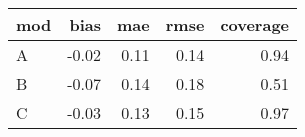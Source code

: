 \begin{table}[ht]
\centering
\begin{tabular}{lrrrr}
  \hline
mod & bias & mae & rmse & coverage \\ 
  \hline
A & -0.02 & 0.11 & 0.14 & 0.94 \\ 
  B & -0.07 & 0.14 & 0.18 & 0.51 \\ 
  C & -0.03 & 0.13 & 0.15 & 0.97 \\ 
   \hline
\end{tabular}
\end{table}
